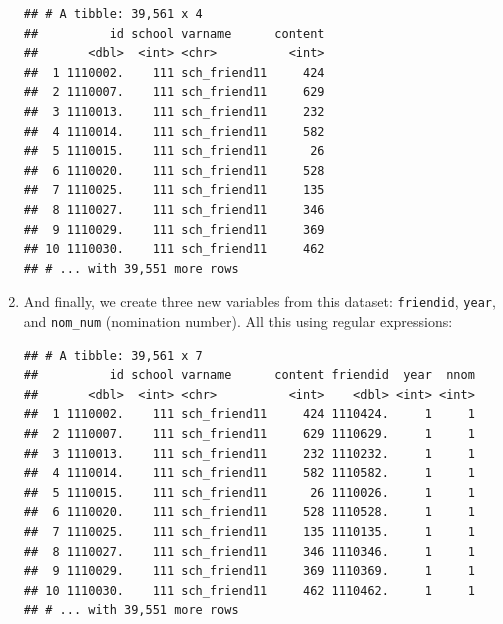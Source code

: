 \documentclass[]{book}
\newenvironment{Shaded}{\begin{snugshade}}{\end{snugshade}}
\newcommand{\KeywordTok}[1]{\textcolor[rgb]{0.13,0.29,0.53}{\textbf{#1}}}
\newcommand{\DataTypeTok}[1]{\textcolor[rgb]{0.13,0.29,0.53}{#1}}
\newcommand{\DecValTok}[1]{\textcolor[rgb]{0.00,0.00,0.81}{#1}}
\newcommand{\StringTok}[1]{\textcolor[rgb]{0.31,0.60,0.02}{#1}}
\newcommand{\OperatorTok}[1]{\textcolor[rgb]{0.81,0.36,0.00}{\textbf{#1}}}
\newcommand{\NormalTok}[1]{#1}
\theoremstyle{definition}
\theoremstyle{definition}
\theoremstyle{definition}
\theoremstyle{remark}
\begin{document}
\begin{enumerate}
\begin{verbatim}
## # A tibble: 39,561 x 4
##          id school varname      content
##       <dbl>  <int> <chr>          <int>
##  1 1110002.    111 sch_friend11     424
##  2 1110007.    111 sch_friend11     629
##  3 1110013.    111 sch_friend11     232
##  4 1110014.    111 sch_friend11     582
##  5 1110015.    111 sch_friend11      26
##  6 1110020.    111 sch_friend11     528
##  7 1110025.    111 sch_friend11     135
##  8 1110027.    111 sch_friend11     346
##  9 1110029.    111 sch_friend11     369
## 10 1110030.    111 sch_friend11     462
## # ... with 39,551 more rows
\end{verbatim}
\item
  And finally, we create three new variables from this dataset:
  \texttt{friendid}, \texttt{year}, and \texttt{nom\_num} (nomination
  number). All this using regular expressions:

\begin{Shaded}
\end{Shaded}

\begin{verbatim}
## # A tibble: 39,561 x 7
##          id school varname      content friendid  year  nnom
##       <dbl>  <int> <chr>          <int>    <dbl> <int> <int>
##  1 1110002.    111 sch_friend11     424 1110424.     1     1
##  2 1110007.    111 sch_friend11     629 1110629.     1     1
##  3 1110013.    111 sch_friend11     232 1110232.     1     1
##  4 1110014.    111 sch_friend11     582 1110582.     1     1
##  5 1110015.    111 sch_friend11      26 1110026.     1     1
##  6 1110020.    111 sch_friend11     528 1110528.     1     1
##  7 1110025.    111 sch_friend11     135 1110135.     1     1
##  8 1110027.    111 sch_friend11     346 1110346.     1     1
##  9 1110029.    111 sch_friend11     369 1110369.     1     1
## 10 1110030.    111 sch_friend11     462 1110462.     1     1
## # ... with 39,551 more rows
\end{verbatim}


\end{enumerate}
\end{document}
